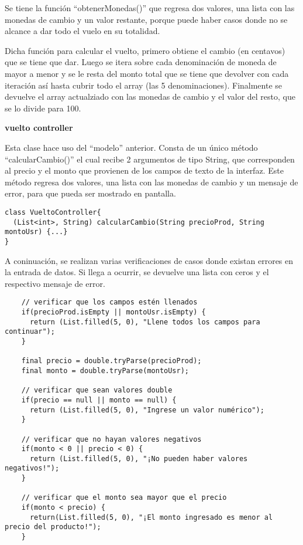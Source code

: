 Se tiene la función “obtenerMonedas()” que regresa dos valores, una lista con las monedas de cambio y un valor restante, porque puede haber casos donde no se alcance a dar todo el vuelo en su totalidad.

Dicha función para calcular el vuelto, primero obtiene el cambio (en centavos) que se tiene que dar. Luego se itera sobre cada denominación de moneda de mayor a menor y se le resta del monto total que se tiene que devolver con cada iteración así hasta cubrir todo el array (las 5 denominaciones). Finalmente se devuelve el array actualziado con las monedas de cambio y el valor del resto, que se lo divide para 100.

\textbf{vuelto controller}

Esta clase hace uso del “modelo” anterior. Consta de un único método “calcularCambio()” el cual recibe 2 argumentos de tipo String, que corresponden al precio y el monto que provienen de los campos de texto de la interfaz. Este método regresa dos valores, una lista con las monedas de cambio y un mensaje de error, para que pueda ser mostrado en pantalla.

\begin{center}
\begin{lstlisting}
class VueltoController{
  (List<int>, String) calcularCambio(String precioProd, String montoUsr) {...}
}
\end{lstlisting}
\end{center}

A coninuación, se realizan varias verificaciones de casos donde existan errores en la entrada de datos. Si llega a ocurrir, se devuelve una lista con ceros y el respectivo mensaje de error.

\begin{center}
\begin{lstlisting}
    // verificar que los campos estén llenados
    if(precioProd.isEmpty || montoUsr.isEmpty) {
      return (List.filled(5, 0), "Llene todos los campos para continuar");
    }

    final precio = double.tryParse(precioProd);
    final monto = double.tryParse(montoUsr);

    // verificar que sean valores double
    if(precio == null || monto == null) {
      return (List.filled(5, 0), "Ingrese un valor numérico");
    }

    // verificar que no hayan valores negativos
    if(monto < 0 || precio < 0) {
      return (List.filled(5, 0), "¡No pueden haber valores negativos!");
    }

    // verificar que el monto sea mayor que el precio
    if(monto < precio) {
      return(List.filled(5, 0), "¡El monto ingresado es menor al precio del producto!");
    }
\end{lstlisting}
\end{center}

